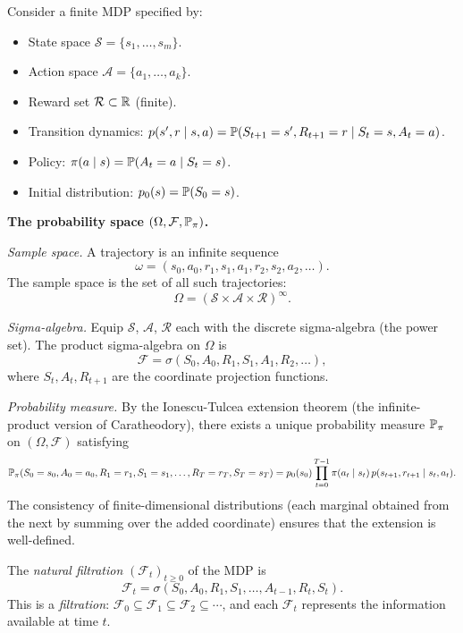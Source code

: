 \documentclass[11pt,a4paper]{article}
\begin{document}
\begin{example}
\label{ex:mdp_prob_space}
Consider a finite MDP specified by:
\begin{itemize}[nosep]
  \item State space $\mathcal{S} = \{s_1, \ldots, s_m\}$.
  \item Action space $\mathcal{A} = \{a_1, \ldots, a_k\}$.
  \item Reward set $\mathcal{R} \subset \mathbb{R}$ (finite).
  \item Transition dynamics: $p(s', r \mid s, a)
    = \mathbb{P}(S_{t+1} = s', R_{t+1} = r \mid S_t = s, A_t = a)$.
  \item Policy: $\pi(a \mid s) = \mathbb{P}(A_t = a \mid S_t = s)$.
  \item Initial distribution: $p_0(s) = \mathbb{P}(S_0 = s)$.
\end{itemize}

\textbf{The probability space $(\Omega, \mathcal{F}, \mathbb{P}_\pi)$.}

\textit{Sample space.} A trajectory is an infinite sequence
\[
  \omega = (s_0, a_0, r_1, s_1, a_1, r_2, s_2, a_2, \ldots).
\]
The sample space is the set of all such trajectories:
\[
  \Omega = (\mathcal{S} \times \mathcal{A} \times \mathcal{R})^\infty.
\]

\textit{Sigma-algebra.} Equip $\mathcal{S}$, $\mathcal{A}$, $\mathcal{R}$
each with the discrete sigma-algebra (the power set). The product
sigma-algebra on $\Omega$ is
\[
  \mathcal{F} = \sigma(S_0, A_0, R_1, S_1, A_1, R_2, \ldots),
\]
where $S_t, A_t, R_{t+1}$ are the coordinate projection functions.

\textit{Probability measure.} By the Ionescu-Tulcea extension theorem
(the infinite-product version of Caratheodory), there exists a unique
probability measure $\mathbb{P}_\pi$ on $(\Omega, \mathcal{F})$ satisfying
\begin{equation}
  \mathbb{P}_\pi(S_0 = s_0, A_0 = a_0, R_1 = r_1, S_1 = s_1, \ldots,
  R_T = r_T, S_T = s_T)
  = p_0(s_0) \prod_{t=0}^{T-1} \pi(a_t \mid s_t)\,
    p(s_{t+1}, r_{t+1} \mid s_t, a_t).
  \label{eq:mdp_prob}
\end{equation}
The consistency of finite-dimensional distributions (each marginal obtained
from the next by summing over the added coordinate) ensures that the
extension is well-defined.
\end{example}

\begin{definition}
\label{def:mdp_filtration}
The \emph{natural filtration} $(\mathcal{F}_t)_{t \geq 0}$ of the MDP is
\begin{equation}
  \mathcal{F}_t = \sigma(S_0, A_0, R_1, S_1, \ldots, A_{t-1}, R_t, S_t).
  \label{eq:mdp_filtration}
\end{equation}
This is a \emph{filtration}: $\mathcal{F}_0 \subseteq \mathcal{F}_1
\subseteq \mathcal{F}_2 \subseteq \cdots$, and each $\mathcal{F}_t$
represents the information available at time $t$.
\end{definition}
\end{document}
